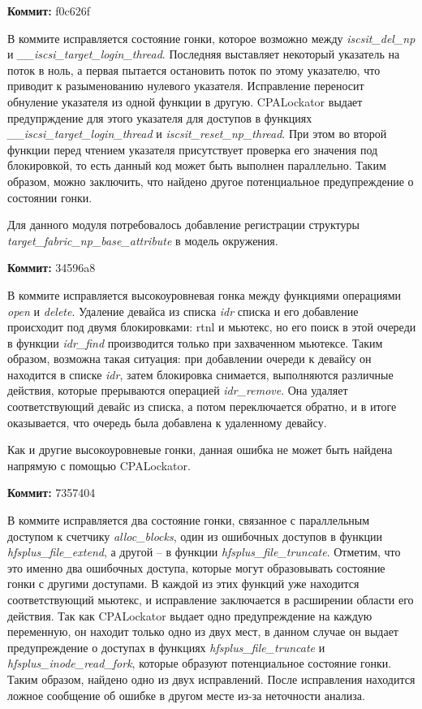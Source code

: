 \textbf{Коммит:} f0c626f

В коммите исправляется состояние гонки, которое возможно между \textit{iscsit\_del\_np} и \textit{\_\_iscsi\_target\_login\_thread}.
Последняя выставляет некоторый указатель на поток в ноль, а первая пытается остановить поток по этому указателю, что приводит к разыменованию нулевого указателя.
Исправление переносит обнуление указателя из одной функции в другую.
CPALockator выдает предупрждение для этого указателя для доступов в функциях \textit{\_\_iscsi\_target\_login\_thread} и \textit{iscsit\_reset\_np\_thread}.
При этом во второй функции перед чтением указателя присутствует проверка его значения под блокировкой, то есть данный код может быть выполнен параллельно.
Таким образом, можно заключить, что найдено другое потенциальное предупреждение о состоянии гонки.

Для данного модуля потребовалось добавление регистрации структуры \textit{target\_fabric\_np\_base\_attribute} в модель окружения.

\vspace{1cm}

\textbf{Коммит:} 34596a8

В коммите исправляется высокоуровневая гонка между функциями операциями \textit{open} и \textit{delete}.
Удаление девайса из списка \textit{idr} списка и его добавление происходит под двумя блокировками: rtnl и мьютекс, но его поиск  в этой очереди в функции \textit{idr\_find} производится только при захваченном мьютексе.
Таким образом, возможна такая ситуация: при добавлении очереди к девайсу он находится в списке \textit{idr}, затем блокировка снимается, выполняются различные действия, которые прерываются операцией \textit{idr\_remove}. 
Она удаляет соответствующий девайс из списка, а потом переключается обратно, и в итоге оказывается, что очередь была добавлена к удаленному девайсу.

Как и другие высокоуровневые гонки, данная ошибка не может быть найдена напрямую с помощью CPALockator.

\vspace{1cm}

\textbf{Коммит:} 7357404

В коммите исправляется два состояние гонки, связанное с параллельным доступом к счетчику \textit{alloc\_blocks}, один из ошибочных доступов в функции \textit{hfsplus\_file\_extend}, а другой -- в функции \textit{hfsplus\_file\_truncate}.
Отметим, что это именно два ошибочных доступа, которые могут образовывать состояние гонки с другими доступами.
В каждой из этих функций уже находится соответствующий мьютекс, и исправление заключается в расширении области его действия.
Так как CPALockator выдает одно предупреждение на каждую переменную, он находит только одно из двух мест, в данном случае он выдает предупреждение о доступах в функциях \textit{hfsplus\_file\_truncate} и \textit{hfsplus\_inode\_read\_fork}, которые образуют потенциальное состояние гонки.
Таким образом, найдено одно из двух исправлений.
После исправления находится ложное сообщение об ошибке в другом месте из-за неточности анализа.

